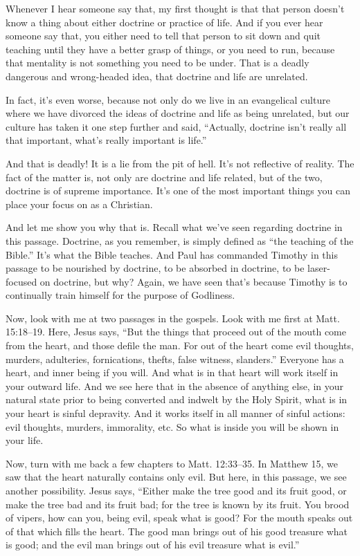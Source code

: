 \documentclass[letterpaper, 12pt]{article}
\begin{document}
    Whenever I hear someone say that, my first thought is that that
    person doesn't know a thing about either doctrine or practice of
    life. And if you ever hear someone say that, you either need to tell
    that person to sit down and quit teaching until they have a better
    grasp of things, or you need to run, because that mentality is not
    something you need to be under. That is a deadly dangerous and
    wrong-headed idea, that doctrine and life are unrelated.

    In fact, it's even worse, because not only do we live in an
    evangelical culture where we have divorced the ideas of doctrine and
    life as being unrelated, but our culture has taken it one step
    further and said, ``Actually, doctrine isn't really all that
    important, what's really important is life.'' 

    And that is deadly! It is a lie from the pit of hell. It's not
    reflective of reality. The fact of the matter is, not only are
    doctrine and life related, but of the two, doctrine is of supreme
    importance. It's one of the most important things you can place your
    focus on as a Christian. 

    And let me show you why that is. Recall what we've seen regarding
    doctrine in this passage. Doctrine, as you remember, is simply
    defined as ``the teaching of the Bible.'' It's what the Bible
    teaches. And Paul has commanded Timothy in this passage to be
    nourished by doctrine, to be absorbed in doctrine, to be
    laser-focused on doctrine, but why? Again, we have seen that's
    because Timothy is to continually train himself for the purpose of
    Godliness.

    Now, look with me at two passages in the gospels. Look with me first
    at Matt. 15:18--19. Here, Jesus says, ``But the things that proceed
    out of the mouth come from the heart, and those defile the man. For
    out of the heart come evil thoughts, murders, adulteries,
    fornications, thefts, false witness, slanders.'' Everyone has a
    heart, and inner being if you will. And what is in that heart will
    work itself in your outward life. And we see here that in the
    absence of anything else, in your natural state prior to being
    converted and indwelt by the Holy Spirit, what is in your heart is
    sinful depravity. And it works itself in all manner of sinful
    actions: evil thoughts, murders, immorality, etc. So what is inside
    you will be shown in your life.

    Now, turn with me back a few chapters to Matt. 12:33--35. In Matthew
    15, we saw that the heart naturally contains only evil. But here, in
    this passage, we see another possibility. Jesus says, ``Either make
    the tree good and its fruit good, or make the tree bad and its fruit
    bad; for the tree is known by its fruit. You brood of vipers, how
    can you, being evil, speak what is good? For the mouth speaks out of
    that which fills the heart. The good man brings out of his good
    treasure what is good; and the evil man brings out of his evil
    treasure what is evil.''
\end{document}
